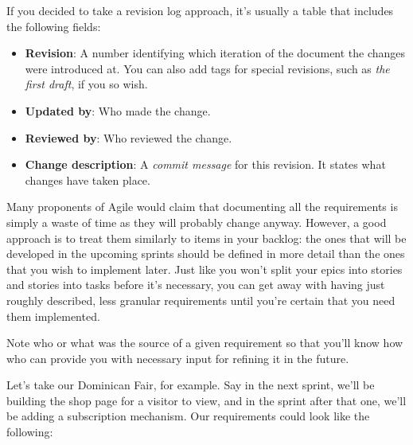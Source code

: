If you decided to take a revision log approach, it's usually a table that includes the following fields:


\begin{itemize}
\item 
\textbf{Revision}: A number identifying which iteration of the document the changes were introduced at. You can also add tags for special revisions, such as \textit{the first draft}, if you so wish.

\item 
\textbf{Updated by}: Who made the change.

\item 
\textbf{Reviewed by}: Who reviewed the change.

\item
\textbf{Change description}: A \textit{commit message} for this revision. It states what changes have taken place.

\end{itemize}


Many proponents of Agile would claim that documenting all the requirements is simply a waste of time as they will probably change anyway. However, a good approach is to treat them similarly to items in your backlog: the ones that will be developed in the upcoming sprints should be defined in more detail than the ones that you wish to implement later. Just like you won't split your epics into stories and stories into tasks before it's necessary, you can get away with having just roughly described, less granular requirements until you're certain that you need them implemented.

\begin{tcolorbox}[colback=webgreen!5!white,colframe=webgreen!75!black, title=TIP]
\hspace*{0.7cm}Note who or what was the source of a given requirement so that you'll know how who can provide you with necessary input for refining it in the future.

\end{tcolorbox}

Let's take our Dominican Fair, for example. Say in the next sprint, we'll be building the shop page for a visitor to view, and in the sprint after that one, we'll be adding a subscription mechanism. Our requirements could look like the following:



